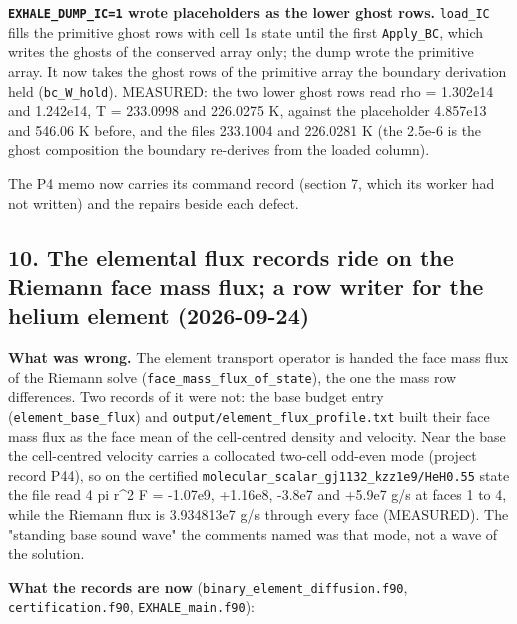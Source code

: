 \documentclass[english,a4paper]{my_memo}
\begin{document}
\textbf{\texttt{EXHALE\_DUMP\_IC=1} wrote placeholders as the lower ghost rows.} \texttt{load\_IC}
fills the primitive ghost rows with cell 1\textquotesingle s state until the first \texttt{Apply\_BC},
which writes the ghosts of the conserved array only; the dump wrote the
primitive array. It now takes the ghost rows of the primitive array the
boundary derivation held (\texttt{bc\_W\_hold}). MEASURED: the two lower ghost rows
read rho = 1.302e14 and 1.242e14, T = 233.0998 and 226.0275 K, against the
placeholder 4.857e13 and 546.06 K before, and the file\textquotesingle s 233.1004 and 226.0281
K (the 2.5e-6 is the ghost composition the boundary re-derives from the loaded
column).

The P4 memo now carries its command record (section 7, which its worker had
not written) and the repairs beside each defect.

\subsection{10. The elemental flux records ride on the Riemann face mass flux; a row writer for the helium element (2026-09-24)}\label{10-the-elemental-flux-records-ride-on-the-riemann-face-mass-flux-a-row-writer-for-the-helium-element-2026-09-24}

\textbf{What was wrong.} The element transport operator is handed the face mass
flux of the Riemann solve (\texttt{face\_mass\_flux\_of\_state}), the one the mass row
differences. Two records of it were not: the base budget entry
(\texttt{element\_base\_flux}) and \texttt{output/element\_flux\_profile.txt} built their face
mass flux as the face mean of the cell-centred density and velocity. Near the
base the cell-centred velocity carries a collocated two-cell odd-even mode
(project record P44), so on the certified \texttt{molecular\_scalar\_gj1132\_kzz1e9/HeH0.55}
state the file read 4 pi r\^{}2 F = -1.07e9, +1.16e8, -3.8e7 and +5.9e7 g/s at
faces 1 to 4, while the Riemann flux is 3.934813e7 g/s through every face
(MEASURED). The "standing base sound wave" the comments named was that mode,
not a wave of the solution.

\textbf{What the records are now} (\texttt{binary\_element\_diffusion.f90},
\texttt{certification.f90}, \texttt{EXHALE\_main.f90}):
\end{document}
